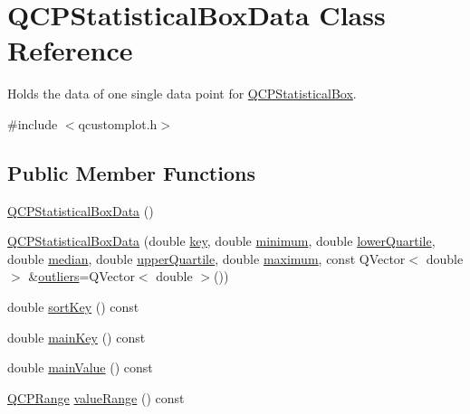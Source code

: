 \hypertarget{class_q_c_p_statistical_box_data}{}\section{Q\+C\+P\+Statistical\+Box\+Data Class Reference}
\label{class_q_c_p_statistical_box_data}


Holds the data of one single data point for \mbox{\hyperlink{class_q_c_p_statistical_box}{Q\+C\+P\+Statistical\+Box}}.  




{\ttfamily \#include $<$qcustomplot.\+h$>$}

\subsection*{Public Member Functions}
\begin{DoxyCompactItemize}
\item 
\mbox{\hyperlink{class_q_c_p_statistical_box_data_ab96c4b93670a8dcac8a3d4080fd722ee}{Q\+C\+P\+Statistical\+Box\+Data}} ()
\item 
\mbox{\hyperlink{class_q_c_p_statistical_box_data_a66b0c6d39765d0feb49c286fba4e4ef5}{Q\+C\+P\+Statistical\+Box\+Data}} (double \mbox{\hyperlink{class_q_c_p_statistical_box_data_a2d0b5ca5130e8a73294c46b8b2fd77b8}{key}}, double \mbox{\hyperlink{class_q_c_p_statistical_box_data_adc2f4b8cbff9f2e4a676f32bad8a7e3a}{minimum}}, double \mbox{\hyperlink{class_q_c_p_statistical_box_data_af9f478b4ea0789fa6cff7eebb654b5d4}{lower\+Quartile}}, double \mbox{\hyperlink{class_q_c_p_statistical_box_data_a116cd53ae6685979ec3b051cfc7dbba5}{median}}, double \mbox{\hyperlink{class_q_c_p_statistical_box_data_a5604dfe04b103e5ac73ce7895b46303b}{upper\+Quartile}}, double \mbox{\hyperlink{class_q_c_p_statistical_box_data_aa2800abda337decfc4277cb8bf846d6f}{maximum}}, const Q\+Vector$<$ double $>$ \&\mbox{\hyperlink{class_q_c_p_statistical_box_data_abaa27539fbd941d3f1eb8169e881e308}{outliers}}=Q\+Vector$<$ double $>$())
\item 
double \mbox{\hyperlink{class_q_c_p_statistical_box_data_a168100275e85935207deec86216abc88}{sort\+Key}} () const
\item 
double \mbox{\hyperlink{class_q_c_p_statistical_box_data_a4bbbf44f60ac5eca73c5f4135741562e}{main\+Key}} () const
\item 
double \mbox{\hyperlink{class_q_c_p_statistical_box_data_a0df3cb31cfd6d48decf6173297b81746}{main\+Value}} () const
\item 
\mbox{\hyperlink{class_q_c_p_range}{Q\+C\+P\+Range}} \mbox{\hyperlink{class_q_c_p_statistical_box_data_a1a2410fcf3d45fa3a1ad09e265b9bcad}{value\+Range}} () const
\end{DoxyCompactItemize}
